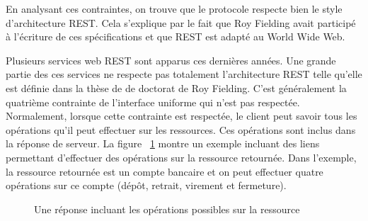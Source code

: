 En analysant ces contraintes, on trouve que le protocole  respecte bien le style d'architecture REST. Cela s'explique par le fait que Roy Fielding avait participé à l'écriture de ces spécifications et que REST est adapté au World Wide Web.  

Plusieurs services web REST sont apparus ces dernières années. Une grande partie des ces services ne respecte pas totalement l'architecture REST telle qu'elle est définie dans la thèse de de doctorat de Roy Fielding. C'est généralement la quatrième contrainte de l'interface uniforme qui n'est pas respectée. Normalement, lorsque cette contrainte est respectée, le client peut savoir tous les opérations qu'il peut effectuer sur les ressources. Ces opérations sont inclus dans la réponse de serveur. La figure ~\ref{fig:hateoas} montre un exemple incluant des liens permettant d'effectuer des opérations sur la ressource retournée. Dans l'exemple, la ressource retournée est un compte bancaire et on peut effectuer quatre opérations sur ce compte (dépôt, retrait, virement et fermeture). 


\begin{figure}[htp]
    \centering
    \caption{Une réponse incluant les opérations possibles sur la ressource}
    \label{fig:hateoas}
\end{figure}



